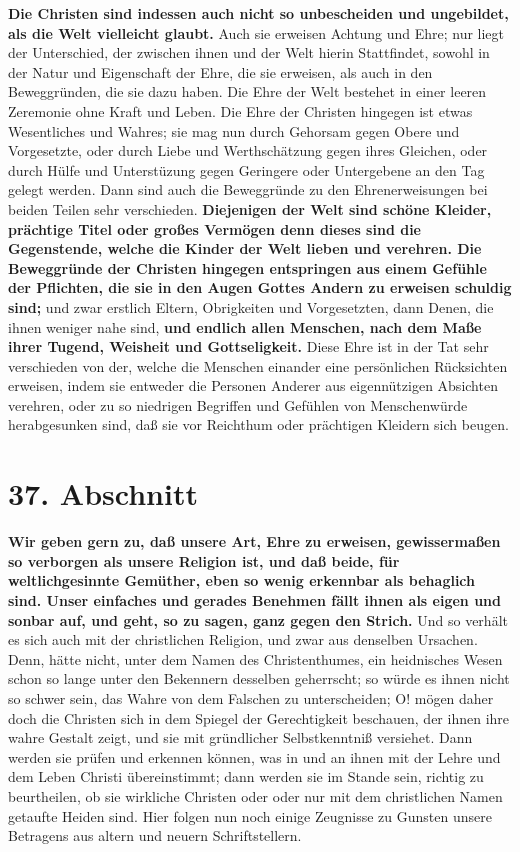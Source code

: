 \textbf{Die Christen sind indessen auch nicht so unbescheiden und ungebildet,
als die
Welt vielleicht glaubt.} Auch sie erweisen Achtung und Ehre; nur liegt der
Unterschied, der zwischen ihnen und der Welt hierin Stattfindet, sowohl in der
Natur und Eigenschaft der Ehre, die sie erweisen, als auch in den Beweggründen,
die sie dazu haben. Die Ehre der Welt bestehet in einer leeren Zeremonie ohne
Kraft und Leben. Die Ehre der Christen hingegen ist etwas Wesentliches und
Wahres; sie mag nun durch Gehorsam gegen Obere und Vorgesetzte, oder durch Liebe
und Werthschätzung gegen ihres Gleichen, oder durch Hülfe und Unterstüzung gegen
Geringere oder Untergebene an den Tag gelegt werden. Dann sind auch die
Beweggründe zu den Ehrenerweisungen bei beiden Teilen sehr verschieden.
\textbf{Diejenigen der Welt sind schöne Kleider, prächtige Titel oder großes
Vermögen
denn dieses sind die Gegenstende, welche die Kinder der Welt lieben und
verehren. Die Beweggründe der Christen hingegen entspringen aus einem Gefühle
der Pflichten, die sie in den Augen Gottes Andern zu erweisen schuldig sind;}
und
zwar erstlich Eltern, Obrigkeiten und Vorgesetzten, dann Denen, die ihnen
weniger nahe sind, \textbf{und endlich allen Menschen, nach dem Maße ihrer
Tugend,
Weisheit und Gottseligkeit.} Diese Ehre ist in der Tat sehr verschieden von der,
welche die Menschen einander eine persönlichen Rücksichten erweisen, indem sie
entweder die Personen Anderer aus eigennützigen Absichten verehren, oder zu so
niedrigen Begriffen und Gefühlen von Menschenwürde herabgesunken sind, daß sie
vor Reichthum oder prächtigen Kleidern sich beugen.

\section{37. Abschnitt} \label{kap9_ab37}

\textbf{Wir geben gern zu, daß unsere Art, Ehre zu erweisen, gewissermaßen so
verborgen
als unsere Religion ist, und daß beide, für weltlichgesinnte Gemüther, eben so
wenig erkennbar als behaglich sind. Unser einfaches und gerades Benehmen fällt
ihnen als eigen und sonbar auf, und geht, so zu sagen, ganz gegen den Strich.}
Und so verhält es sich auch mit der christlichen Religion, und zwar aus
denselben Ursachen. Denn, hätte nicht, unter dem Namen des Christenthumes, ein
heidnisches Wesen schon so lange unter den Bekennern desselben geherrscht; so
würde es ihnen nicht so schwer sein, das Wahre von dem Falschen zu
unterscheiden; O! mögen daher doch die Christen sich in dem Spiegel der
Gerechtigkeit beschauen, der ihnen ihre wahre Gestalt zeigt, und sie mit
gründlicher Selbstkenntniß versiehet. Dann werden sie prüfen und erkennen
können, was in und an ihnen mit der Lehre und dem Leben Christi übereinstimmt;
dann werden sie im Stande sein, richtig zu beurtheilen, ob sie wirkliche
Christen oder oder nur mit dem christlichen Namen getaufte Heiden sind. Hier
folgen nun noch einige Zeugnisse zu Gunsten unsere Betragens aus altern und
neuern Schriftstellern.

